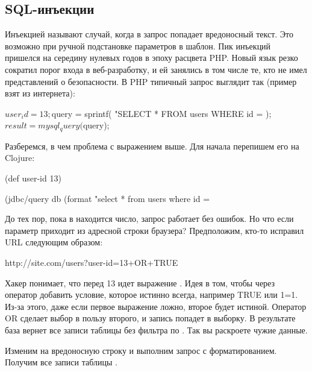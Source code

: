 \subsection{SQL-инъекции}

Инъекцией называют случай, когда в запрос попадает вредоносный текст. Это возможно при ручной подстановке параметров в шаблон. Пик инъекций пришелся на середину нулевых годов в эпоху расцвета PHP. Новый язык резко сократил порог входа в веб-разработку, и ей занялись в том числе те, кто не имел представлений о безопасности. В PHP типичный запрос выглядит так (пример взят из интернета):

\begin{english}
  \begin{php}
$user_id = 13;
$query = sprintf(
  "SELECT * FROM users WHERE id = %
);
$result = mysql_query($query);
  \end{php}
\end{english}

Разберемся, в чем проблема с выражением выше. Для начала перепишем его на Clojure:

\begin{english}
  \begin{clojure}
(def user-id 13)

(jdbc/query db
  (format "select * from users where id = %
  \end{clojure}
\end{english}

До тех пор, пока в  находится число, запрос работает без ошибок. Но что если параметр приходит из адресной строки браузера? Предположим, кто-то исправил URL следующим образом:

\begin{english}
  \begin{text}
http://site.com/users?user-id=13+OR+TRUE
  \end{text}
\end{english}

Хакер понимает, что перед 13 идет выражение . Идея в том, чтобы через оператор  добавить условие, которое истинно всегда, например TRUE или 1=1. Из-за этого, даже если первое выражение ложно, второе будет истиной. Оператор OR сделает выбор в пользу второго, и запись попадет в выборку. В результате база вернет все записи таблицы без фильтра по . Так вы раскроете чужие данные.

Изменим  на вредоносную строку и выполним запрос с форматированием. Получим все записи таблицы .

